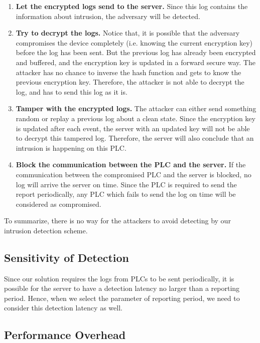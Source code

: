 \begin{enumerate}
\item \textbf{Let the encrypted logs send to the server. } Since this log contains the information about intrusion, the adversary will be detected.

\item \textbf{Try to decrypt the logs.} Notice that, it is possible that the adversary compromises the device completely (i.e. knowing the current encryption key) before the log has been sent. But the previous log has already been encrypted and buffered, and the encryption key is updated in a forward secure way. The attacker has no chance to inverse the hash function and gets to know the previous encryption key. Therefore, the attacker is not able to decrypt the log, and has to send this log as it is. 

\item \textbf{Tamper with the encrypted logs.} The attacker can either send something random or replay a previous log about a clean state. Since the encryption key is updated after each event, the server with an updated key will not be able to decrypt this tampered log. Therefore, the server will also conclude that an intrusion is happening on this PLC. 

\item \textbf{Block the communication between the PLC and the server.} If the communication between the compromised PLC and the server is blocked, no log will arrive the server on time. Since the PLC is required to send the report periodically, any PLC which fails to send the log on time will be considered as compromised. 

\end{enumerate}     

To summarize, there is no way for the attackers to avoid detecting by our intrusion detection scheme. 

\subsection{Sensitivity of Detection}

Since our solution requires the logs from PLCs to be sent periodically, it is possible for the server to have a detection latency no larger than a reporting period. Hence, when we select the parameter of reporting period, we need to consider this detection latency as well. 
   
\subsection{Performance Overhead}